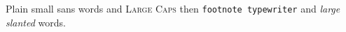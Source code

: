 \documentclass{article}
\begin{document}
Plain {\small\textsf{small sans words}} and {\Large\textsc{Large Caps}} then {\footnotesize\texttt{footnote typewriter}} and {\large\textsl{large slanted}} words.
\end{document}
